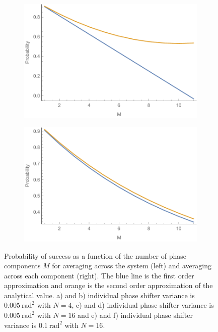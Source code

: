 \documentclass[aps,pra,twocolumn,superscriptaddress,numerical,floatfix]{revtex4-1}
\begin{document}
\begin{figure}
	\begin{subfigure}[b]{.45\columnwidth}
		\includegraphics[width=\columnwidth]{Psuccess_e.pdf}
		\caption{}\label{fig:phase psuccess e}
	\end{subfigure}
	\begin{subfigure}[b]{.45\columnwidth}
		\includegraphics[width=\columnwidth]{Psuccess_f.pdf}
		\caption{}\label{fig:phase psuccess f}
	\end{subfigure}
	
	\caption[Prob success for phase systems]{Probability of success as a function of the number of phase components $M$ for averaging across the system (left) and averaging across each component (right). The blue line is the first order approximation and orange is the second order approximation of the analytical value. a) and b) individual phase shifter variance is $0.005\ \textrm{rad}^{2}$ with $N=4$, c) and d) individual phase shifter variance is $0.005\ \textrm{rad}^{2}$ with $N=16$ and e) and f) individual phase shifter variance is $0.1\ \textrm{rad}^{2}$ with $N=16$. \label{fig:Probability-of-success all}}
\end{figure}
\end{document}

